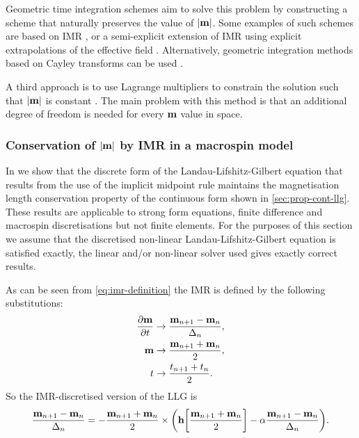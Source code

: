 Geometric time integration schemes aim to solve this problem by constructing a scheme that naturally preserves the value of $\left|{\boldsymbol{\mathrm{m}}} \right|$.
Some examples of such schemes are based on IMR \cite{DAquino2005}, or a semi-explicit extension of IMR using explicit extrapolations of the effective field \cite{Spargo2003} \cite{Serpico2001}.
Alternatively, geometric integration methods based on Cayley transforms can be used \cite{Lewis2003} \cite{Bottauscio2011}.

A third approach is to use Lagrange multipliers to constrain the solution such that $\left|{\boldsymbol{\mathrm{m}}} \right|$ is constant \cite{Szambolics2008a}.
The main problem with this method is that an additional degree of freedom is needed for every $\boldsymbol{\mathrm{m}}$ value in space.

\subsubsection{Conservation of $\left|{\boldsymbol{\mathrm{m}}} \right|$ by IMR in a macrospin model}
\label{sec:proof-magn-length-ode-imr-llg}

In  we show that the discrete form of the Landau-Lifshitz-Gilbert equation that results from the use of the implicit midpoint rule maintains the magnetisation length conservation property of the continuous form shown in \cref{sec:prop-cont-llg}.
These results are applicable to strong form equations, \ie finite difference and macrospin discretisations but not finite elements.
For the purposes of this section we assume that the discretised non-linear Landau-Lifshitz-Gilbert equation is satisfied exactly, \ie the linear and/or non-linear solver used gives exactly correct results.

As can be seen from \cref{eq:imr-definition} the IMR is defined by the following substitutions:
\begin{equation}
\begin{aligned}
  \label{eq:55}
  \frac{\partial \boldsymbol{\mathrm{m}}}{\partial t} &\rightarrow \frac{\boldsymbol{\mathrm{m}}_{n+1} - \boldsymbol{\mathrm{m}}_n}{\Delta_{n}}, \\
  \boldsymbol{\mathrm{m}} &\rightarrow \frac{\boldsymbol{\mathrm{m}}_{n+1} + \boldsymbol{\mathrm{m}}_n}{2}, \\
  t &\rightarrow \frac{t_{n+1} + t_n}{2}.
\end{aligned}
\end{equation}
So the IMR-discretised version of the LLG is
\begin{equation}
  \frac{\boldsymbol{\mathrm{m}}_{n+1} - \boldsymbol{\mathrm{m}}_n}{\Delta_{n}} = - \frac{\boldsymbol{\mathrm{m}}_{n+1} + \boldsymbol{\mathrm{m}}_n}{2} \times
  {\left( \boldsymbol{\mathrm{h}}{\left[ \frac{\boldsymbol{\mathrm{m}}_{n+1} + \boldsymbol{\mathrm{m}}_n}{2} \right]} - \alpha\frac{\boldsymbol{\mathrm{m}}_{n+1} - \boldsymbol{\mathrm{m}}_n}{\Delta_{n}} \right)}.
  \label{eqn:disc-llg}
\end{equation}

